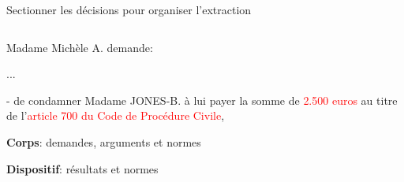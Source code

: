 \begin{frame}{Sectionner les décisions pour organiser l'extraction}
\begin{columns}
\begin{column}{.55\linewidth}
{\begin{minipage}{\textwidth}
				Madame Michèle A. demande:
				
				...
				
				- de condamner Madame JONES-B. à lui payer la somme de \textcolor{red}{2.500 euros} au titre de l'\textcolor{red}{article 700 du Code de Procédure Civile}, 
		\end{minipage}}
		\vspace{0.1cm}
		
		{\normalsize \textbf{Corps}: demandes, arguments et normes }
		
		\vspace{0.4cm}
		
		\vspace{0.1cm}
		
		{\normalsize \textbf{Dispositif}: résultats et normes}
		
	\end{column}
\end{columns}
\end{frame}

